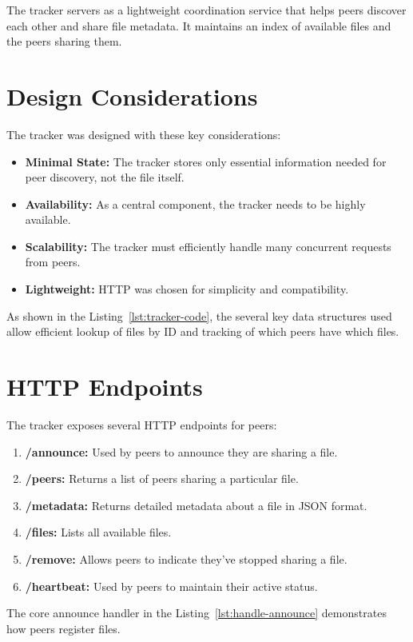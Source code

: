 \documentclass[12pt,a4paper]{report}
\begin{document}
The tracker servers as a lightweight coordination service that helps peers discover each other and share file metadata. It maintains an index of available files and the peers sharing them.

\section*{Design Considerations}
The tracker was designed with these key considerations:
\begin{itemize}
	\item \textbf{Minimal State:} The tracker stores only essential information needed for peer discovery, not the file itself.
	\item \textbf{Availability:} As a central component, the tracker needs to be highly available.
	\item \textbf{Scalability:} The tracker must efficiently handle many concurrent requests from peers.
	\item \textbf{Lightweight:} HTTP was chosen for simplicity and compatibility.
\end{itemize}

As shown in the Listing~\ref{lst:tracker-code}, the several key data structures used allow efficient lookup of files by ID and tracking of which peers have which files.

\section*{HTTP Endpoints}
The tracker exposes several HTTP endpoints for peers:

\begin{enumerate}
	\item \textbf{/announce:} Used by peers to announce they are sharing a file.
	\item \textbf{/peers:} Returns a list of peers sharing a particular file.
	\item \textbf{/metadata:} Returns detailed metadata about a file in JSON format.
	\item \textbf{/files:} Lists all available files.
	\item \textbf{/remove:} Allows peers to indicate they've stopped sharing a file.
	\item \textbf{/heartbeat:} Used by peers to maintain their active status.
\end{enumerate}

The core announce handler in the Listing~\ref{lst:handle-announce} demonstrates how peers register files.
\end{document}
